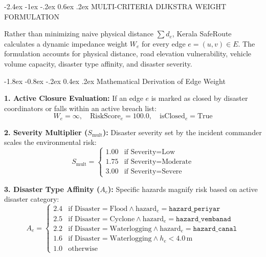 \documentclass[12pt,oneside]{report}
\makeatletter
\renewcommand{\section}{\@startsection{section}{1}{\z@}%
  {-2.4ex \@plus -1ex \@minus -.2ex}%
  {0.6ex \@plus .2ex}%
  {\normalfont\large\bfseries}}
\renewcommand{\subsection}{\@startsection{subsection}{2}{\z@}%
  {-1.8ex \@plus -0.8ex \@minus -.2ex}%
  {0.4ex \@plus .2ex}%
  {\normalfont\normalsize\bfseries}}
\makeatother
\begin{document}
\section{MULTI-CRITERIA DIJKSTRA WEIGHT FORMULATION}

Rather than minimizing naive physical distance $\sum d_e$, Kerala SafeRoute calculates a dynamic impedance weight $W_e$ for every edge $e = (u, v) \in E$. The formulation accounts for physical distance, road elevation vulnerability, vehicle volume capacity, disaster type affinity, and disaster severity.

\subsection{Mathematical Derivation of Edge Weight}

\textbf{1. Active Closure Evaluation:} If an edge $e$ is marked as closed by disaster coordinators or falls within an active breach list:
\begin{equation}
    W_e = \infty, \quad \text{RiskScore}_e = 100.0, \quad \text{isClosed}_e = \text{True}
\end{equation}

\textbf{2. Severity Multiplier ($S_{\text{mult}}$):} Disaster severity set by the incident commander scales the environmental risk:
\begin{equation}
    S_{\text{mult}} = \begin{cases}
    1.00 & \text{if Severity} = \text{Low} \\
    1.75 & \text{if Severity} = \text{Moderate} \\
    3.00 & \text{if Severity} = \text{Severe}
    \end{cases}
\end{equation}

\textbf{3. Disaster Type Affinity ($A_e$):} Specific hazards magnify risk based on active disaster category:
\begin{equation}
    A_e = \begin{cases}
    2.4 & \text{if Disaster} = \text{Flood} \land \text{hazard}_e = \texttt{hazard\_periyar} \\
    2.5 & \text{if Disaster} = \text{Cyclone} \land \text{hazard}_e = \texttt{hazard\_vembanad} \\
    2.2 & \text{if Disaster} = \text{Waterlogging} \land \text{hazard}_e = \texttt{hazard\_canal} \\
    1.6 & \text{if Disaster} = \text{Waterlogging} \land h_e < 4.0\,\text{m} \\
    1.0 & \text{otherwise}
    \end{cases}
\end{equation}
\end{document}
